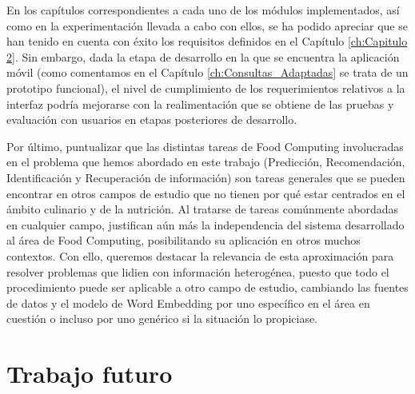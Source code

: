 En los capítulos correspondientes a cada uno de los módulos implementados, así como en la experimentación llevada a cabo con ellos, se ha podido apreciar que se han tenido en cuenta con éxito los requisitos definidos en el Capítulo \ref{ch:Capitulo 2}. Sin embargo, dada la etapa de desarrollo en la que se encuentra la aplicación móvil (como comentamos en el Capítulo \ref{ch:Consultas_Adaptadas} se trata de un prototipo funcional), el nivel de cumplimiento de los requerimientos relativos a la interfaz podría mejorarse con la realimentación que se obtiene de las pruebas y evaluación con usuarios en etapas posteriores de desarrollo.

Por último, puntualizar que las distintas tareas de Food Computing involucradas en el problema que hemos abordado en este trabajo (Predicción, Recomendación, Identificación y Recuperación de información) son tareas generales que se pueden encontrar en otros campos de estudio que no tienen por qué estar centrados en el ámbito culinario y de la nutrición. Al tratarse de tareas comúnmente abordadas en cualquier campo, justifican aún más la independencia del sistema desarrollado al área de Food Computing, posibilitando su aplicación en otros muchos contextos. Con ello, queremos destacar la relevancia de esta aproximación para resolver problemas que lidien con información heterogénea, puesto que todo el procedimiento puede ser aplicable a otro campo de estudio, cambiando las fuentes de datos y  el modelo de Word Embedding por uno específico en el área en cuestión o incluso por uno genérico si la situación lo propiciase.


\section{Trabajo futuro}

